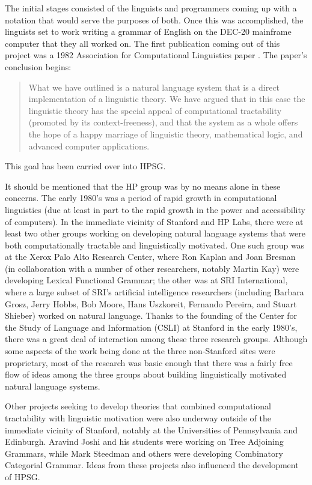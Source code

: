 \documentclass[output=paper]{langsci/langscibook}
\begin{document}
The initial stages consisted of the linguists and programmers coming up with a notation that would serve the purposes of both.  Once this was accomplished, the linguists set to work writing a grammar of English on the DEC-20 mainframe computer that they all worked on.   The first publication coming out of this project was a 1982 Association for Computational Linguistics paper \citet{Gaw:Kin:Lam:82}.  The paper's conclusion begins:
\begin{quote}
What we have outlined is a natural language system that is a direct implementation of a linguistic theory.  We have argued that in this case the linguistic theory has the special appeal of computational tractability (promoted by its context-freeness), and that the system as a whole offers the hope of a happy marriage of linguistic theory, mathematical logic, and advanced computer applications. 
\end{quote}
This goal has been carried over into HPSG.

It should be mentioned that the HP group was by no means alone in these concerns.  The early 1980's was a period of rapid growth in computational linguistics (due at least in part to the rapid growth in the power and accessibility of computers).  In the immediate vicinity of Stanford and HP Labs, there were at least two other groups working on developing natural language systems that were both computationally tractable and linguistically motivated.  One such group was at the Xerox Palo Alto Research Center, where Ron Kaplan and Joan Bresnan (in collaboration with a number of other researchers, notably Martin Kay) were developing Lexical Functional Grammar; the other was at SRI International, where a large subset of SRI's artificial intelligence researchers  (including Barbara Grosz, Jerry Hobbs, Bob Moore, Hans Uszkoreit, Fernando Pereira, and Stuart Shieber) worked on natural language.  Thanks to the founding of the Center for the Study of Language and Information (CSLI) at Stanford in the early 1980's, there was a great deal of interaction among these three research groups.  Although some aspects of the work being done at the three non-Stanford sites were proprietary, most of the research was basic enough that there was a fairly free flow of ideas among the three groups about building linguistically motivated natural language systems.

Other projects seeking to develop theories that combined computational tractability with linguistic motivation were also underway outside of the immediate vicinity of Stanford, notably at the Universities of Pennsylvania and Edinburgh.  Aravind Joshi and his students were working on Tree Adjoining Grammars, while Mark Steedman and others were developing Combinatory Categorial Grammar.  Ideas from these projects also influenced the development of HPSG.
\end{document}
